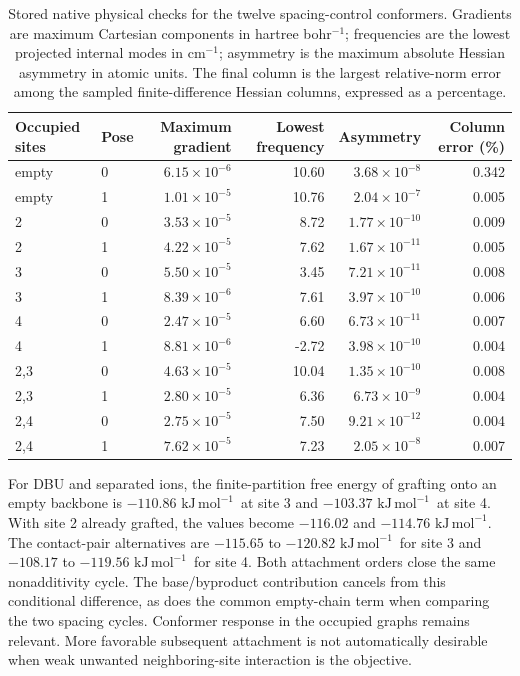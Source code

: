 \documentclass[11pt]{article}
\newcommand{\kj}{\ensuremath{\mathrm{kJ\,mol^{-1}}}}
\begin{document}
\begin{table}[htbp]\centering\small
\caption{Stored native physical checks for the twelve spacing-control conformers. Gradients are maximum Cartesian components in hartree bohr$^{-1}$; frequencies are the lowest projected internal modes in cm$^{-1}$; asymmetry is the maximum absolute Hessian asymmetry in atomic units. The final column is the largest relative-norm error among the sampled finite-difference Hessian columns, expressed as a percentage.}
\label{tab:spacing-native-qc}
\begin{tabular}{llrrrr}\toprule
Occupied sites & Pose & Maximum gradient & Lowest frequency & Asymmetry & Column error (\%)\\\midrule
empty & 0 & $6.15\times10^{-6}$ & 10.60 & $3.68\times10^{-8}$ & 0.342\\
empty & 1 & $1.01\times10^{-5}$ & 10.76 & $2.04\times10^{-7}$ & 0.005\\
2 & 0 & $3.53\times10^{-5}$ & 8.72 & $1.77\times10^{-10}$ & 0.009\\
2 & 1 & $4.22\times10^{-5}$ & 7.62 & $1.67\times10^{-11}$ & 0.005\\
3 & 0 & $5.50\times10^{-5}$ & 3.45 & $7.21\times10^{-11}$ & 0.008\\
3 & 1 & $8.39\times10^{-6}$ & 7.61 & $3.97\times10^{-10}$ & 0.006\\
4 & 0 & $2.47\times10^{-5}$ & 6.60 & $6.73\times10^{-11}$ & 0.007\\
4 & 1 & $8.81\times10^{-6}$ & -2.72 & $3.98\times10^{-10}$ & 0.004\\
2,3 & 0 & $4.63\times10^{-5}$ & 10.04 & $1.35\times10^{-10}$ & 0.008\\
2,3 & 1 & $2.80\times10^{-5}$ & 6.36 & $6.73\times10^{-9}$ & 0.004\\
2,4 & 0 & $2.75\times10^{-5}$ & 7.50 & $9.21\times10^{-12}$ & 0.004\\
2,4 & 1 & $7.62\times10^{-5}$ & 7.23 & $2.05\times10^{-8}$ & 0.007\\
\bottomrule\end{tabular}\end{table}

For DBU and separated ions, the finite-partition free energy of grafting onto an empty backbone is $-110.86$ \kj\ at site 3 and $-103.37$ \kj\ at site 4. With site 2 already grafted, the values become $-116.02$ and $-114.76$ \kj. The contact-pair alternatives are $-115.65$ to $-120.82$ \kj\ for site 3 and $-108.17$ to $-119.56$ \kj\ for site 4. Both attachment orders close the same nonadditivity cycle. The base/byproduct contribution cancels from this conditional difference, as does the common empty-chain term when comparing the two spacing cycles. Conformer response in the occupied graphs remains relevant. More favorable subsequent attachment is not automatically desirable when weak unwanted neighboring-site interaction is the objective.
\end{document}
